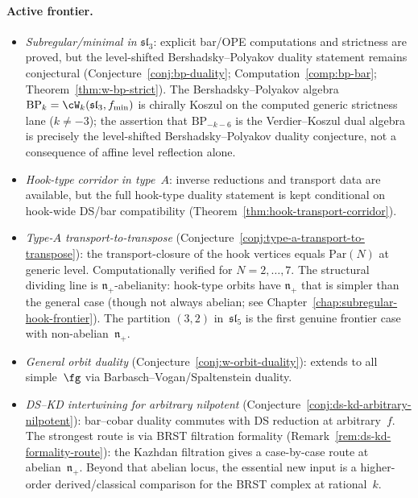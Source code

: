 \paragraph{Active frontier.}
\begin{itemize}
\item \emph{Subregular/minimal in $\mathfrak{sl}_3$}:
 explicit bar/OPE computations and strictness are proved, but the
 level-shifted Bershadsky--Polyakov duality statement remains
 conjectural
 (Conjecture~\ref{conj:bp-duality};
 Computation~\ref{comp:bp-bar};
 Theorem~\ref{thm:w-bp-strict}).
 The Bershadsky--Polyakov algebra $\mathrm{BP}_k =
 \cW_k(\mathfrak{sl}_3, f_{\mathrm{min}})$ is chirally Koszul on the
 computed generic strictness lane ($k \neq -3$); the assertion that
 $\mathrm{BP}_{-k-6}$ is the Verdier--Koszul dual algebra is precisely
 the level-shifted Bershadsky--Polyakov duality conjecture, not a
 consequence of affine level reflection alone.
\item \emph{Hook-type corridor in type~$A$}:
 inverse reductions and transport data are available, but the full
 hook-type duality statement is kept conditional on hook-wide
 DS/bar compatibility
 (Theorem~\ref{thm:hook-transport-corridor}).
\item \emph{Type-$A$ transport-to-transpose}
 (Conjecture~\ref{conj:type-a-transport-to-transpose}):
 the transport-closure of the hook vertices equals
 $\mathrm{Par}(N)$ at generic level.
 Computationally verified for $N = 2, \ldots, 7$.
 The structural dividing line is
 $\mathfrak{n}_+$-abelianity: hook-type orbits have
 $\mathfrak{n}_+$ that is simpler than the general case
 (though not always abelian; see
 Chapter~\ref{chap:subregular-hook-frontier}).
 The partition $(3,2)$ in~$\mathfrak{sl}_5$ is the first
 genuine frontier case with non-abelian~$\mathfrak{n}_+$.
\item \emph{General orbit duality}
 (Conjecture~\ref{conj:w-orbit-duality}):
 extends to all simple~$\fg$ via Barbasch--Vogan/Spaltenstein
 duality.
\item \emph{DS--KD intertwining for arbitrary nilpotent}
 (Conjecture~\ref{conj:ds-kd-arbitrary-nilpotent}):
 bar--cobar duality commutes with DS reduction at arbitrary~$f$.
 The strongest route is via BRST filtration formality
 (Remark~\ref{rem:ds-kd-formality-route}): the Kazhdan
 filtration gives a case-by-case route at abelian~$\mathfrak{n}_+$.
 Beyond that abelian locus, the essential new input is a
 higher-order derived/classical comparison for the BRST complex at
 rational~$k$.
\end{itemize}

